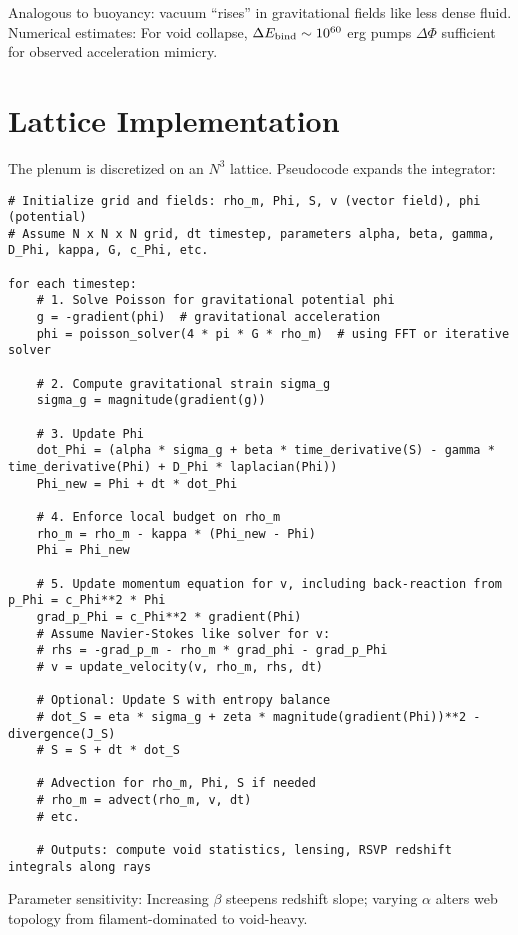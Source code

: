 \documentclass[11pt]{article}
\theoremstyle{plain}
\theoremstyle{definition}
\begin{document}
Analogous to buoyancy: vacuum ``rises'' in gravitational fields like less dense fluid. Numerical estimates: For void collapse, $\Delta E_{\rm bind} \sim 10^{60}$ erg pumps $\Delta \Phi$ sufficient for observed acceleration mimicry.

\section{Lattice Implementation}
The plenum is discretized on an $N^3$ lattice. Pseudocode expands the integrator:

\begin{small}
\begin{verbatim}
# Initialize grid and fields: rho_m, Phi, S, v (vector field), phi (potential)
# Assume N x N x N grid, dt timestep, parameters alpha, beta, gamma, D_Phi, kappa, G, c_Phi, etc.

for each timestep:
    # 1. Solve Poisson for gravitational potential phi
    g = -gradient(phi)  # gravitational acceleration
    phi = poisson_solver(4 * pi * G * rho_m)  # using FFT or iterative solver
    
    # 2. Compute gravitational strain sigma_g
    sigma_g = magnitude(gradient(g))
    
    # 3. Update Phi
    dot_Phi = (alpha * sigma_g + beta * time_derivative(S) - gamma * time_derivative(Phi) + D_Phi * laplacian(Phi))
    Phi_new = Phi + dt * dot_Phi
    
    # 4. Enforce local budget on rho_m
    rho_m = rho_m - kappa * (Phi_new - Phi)
    Phi = Phi_new
    
    # 5. Update momentum equation for v, including back-reaction from p_Phi = c_Phi**2 * Phi
    grad_p_Phi = c_Phi**2 * gradient(Phi)
    # Assume Navier-Stokes like solver for v:
    # rhs = -grad_p_m - rho_m * grad_phi - grad_p_Phi
    # v = update_velocity(v, rho_m, rhs, dt)
    
    # Optional: Update S with entropy balance
    # dot_S = eta * sigma_g + zeta * magnitude(gradient(Phi))**2 - divergence(J_S)
    # S = S + dt * dot_S
    
    # Advection for rho_m, Phi, S if needed
    # rho_m = advect(rho_m, v, dt)
    # etc.
    
    # Outputs: compute void statistics, lensing, RSVP redshift integrals along rays
\end{verbatim}
\end{small}
Parameter sensitivity: Increasing $\beta$ steepens redshift slope; varying $\alpha$ alters web topology from filament-dominated to void-heavy.
\end{document}
